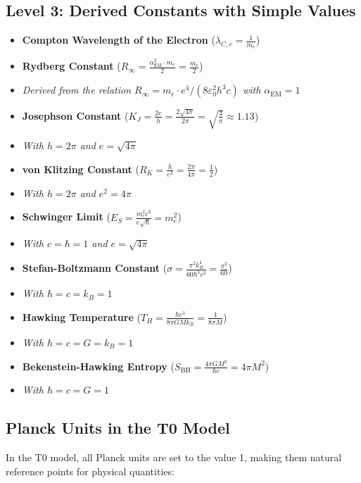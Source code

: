 \documentclass[12pt,a4paper]{article}
\newcommand{\alphaEM}{\alpha_{\text{EM}}}
\begin{document}
	\subsection*{Level 3: Derived Constants with Simple Values}
	\begin{itemize}[itemsep=0.5em]
		\item \textbf{Compton Wavelength of the Electron} (\(\lambda_{C,e} = \frac{1}{m_e}\))
		\item \textbf{Rydberg Constant} (\(R_\infty = \frac{\alphaEM^2 \cdot m_e}{2} = \frac{m_e}{2}\))
		\item[] \textit{Derived from the relation $R_\infty = m_e\cdot e^4/(8\varepsilon_0^2h^3c)$ with $\alphaEM = 1$}
		\item \textbf{Josephson Constant} (\(K_J = \frac{2e}{h} = \frac{2\sqrt{4\pi}}{2\pi} = \sqrt{\frac{4}{\pi}} \approx 1.13\))
		\item[] \textit{With $h = 2\pi$ and $e = \sqrt{4\pi}$}
		\item \textbf{von Klitzing Constant} (\(R_K = \frac{h}{e^2} = \frac{2\pi}{4\pi} = \frac{1}{2}\))
		\item[] \textit{With $h = 2\pi$ and $e^2 = 4\pi$}
		\item \textbf{Schwinger Limit} (\(E_S = \frac{m_e^2c^3}{e\sqrt{\hbar}} = m_e^2\))
		\item[] \textit{With $c = \hbar = 1$ and $e = \sqrt{4\pi}$}
		\item \textbf{Stefan-Boltzmann Constant} (\(\sigma = \frac{\pi^2k_B^4}{60\hbar^3c^2} = \frac{\pi^2}{60}\))
		\item[] \textit{With $\hbar = c = k_B = 1$}
		\item \textbf{Hawking Temperature} (\(T_H = \frac{\hbar c^3}{8\pi GMk_B} = \frac{1}{8\pi M}\))
		\item[] \textit{With $\hbar = c = G = k_B = 1$}
		\item \textbf{Bekenstein-Hawking Entropy} (\(S_{\mathrm{BH}} = \frac{4\pi GM^2}{\hbar c} = 4\pi M^2\))
		\item[] \textit{With $\hbar = c = G = 1$}
	\end{itemize}


	
	\subsection*{Planck Units in the T0 Model}
	
	In the T0 model, all Planck units are set to the value 1, making them natural reference points for physical quantities:
	
\end{document}
